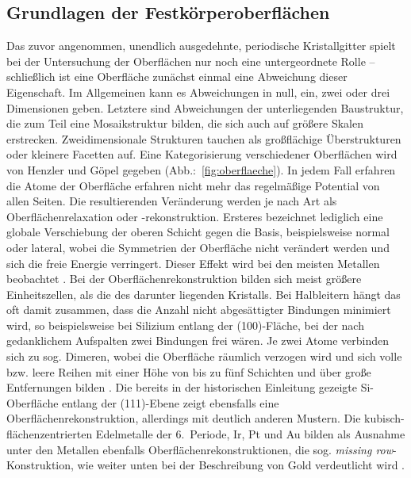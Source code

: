 \subsection{Grundlagen der Festkörperoberflächen}
Das zuvor angenommen, unendlich ausgedehnte, periodische Kristallgitter spielt 
bei der Untersuchung der Oberflächen nur noch eine untergeordnete Rolle – 
schließlich ist eine Oberfläche zunächst einmal eine Abweichung dieser 
Eigenschaft. Im Allgemeinen kann es Abweichungen in null, ein, zwei oder drei 
Dimensionen geben. Letztere sind Abweichungen der unterliegenden Baustruktur, 
die zum Teil eine Mosaikstruktur bilden, die sich auch auf größere Skalen 
erstrecken. Zweidimensionale Strukturen tauchen als großflächige 
Überstrukturen oder kleinere Facetten auf. Eine Kategorisierung verschiedener 
Oberflächen wird von Henzler und Göpel \cite{henzler1991oberflachenphysik} 
gegeben (Abb.:~\ref{fig:oberflaeche}).
In jedem Fall erfahren die Atome der Oberfläche erfahren nicht mehr das 
regelmäßige Potential von allen Seiten. Die resultierenden Veränderung werden je 
nach Art als Oberflächenrelaxation oder -rekonstruktion. 
Ersteres bezeichnet lediglich eine globale Verschiebung der oberen Schicht 
gegen die Basis, beispielsweise normal oder lateral, wobei die Symmetrien 
der Oberfläche nicht verändert werden und sich die freie Energie verringert. 
Dieser Effekt wird bei den meisten Metallen beobachtet \cite{oura2003surface}.
Bei der Oberflächenrekonstruktion bilden sich meist größere Einheitszellen, als die 
des darunter liegenden Kristalls. Bei Halbleitern hängt das oft damit zusammen, 
dass die Anzahl nicht abgesättigter Bindungen minimiert wird, so beispielsweise 
bei Silizium entlang der (100)-Fläche, bei der nach gedanklichem Aufspalten zwei 
Bindungen frei wären. Je zwei Atome verbinden sich zu sog. Dimeren, wobei die 
Oberfläche räumlich verzogen wird und sich volle bzw. leere Reihen mit einer 
Höhe von bis zu fünf Schichten und über große Entfernungen bilden 
\cite{chadi1979atomic}. Die bereits in der historischen Einleitung gezeigte 
Si-Oberfläche entlang der 
(111)-Ebene zeigt ebensfalls eine Oberflächenrekonstruktion, allerdings mit 
deutlich anderen Mustern. Die kubisch-flächenzentrierten Edelmetalle der 
6.~Periode, Ir, Pt und Au bilden als Ausnahme unter den Metallen ebenfalls 
Oberflächenrekonstruktionen, die sog. \emph{missing row}-Konstruktion, 
wie weiter unten bei der Beschreibung von Gold verdeutlicht wird 
\cite{kittel2013einfuhrung}. 


